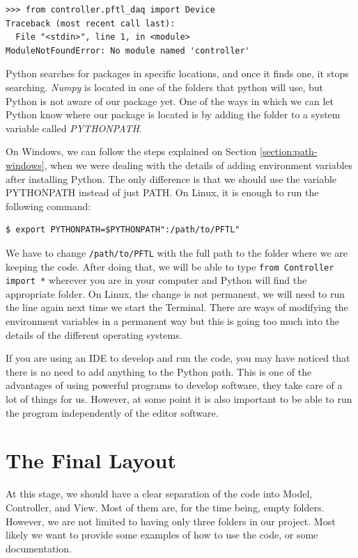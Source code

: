 \begin{verbatim}
>>> from controller.pftl_daq import Device
Traceback (most recent call last):
  File "<stdin>", line 1, in <module>
ModuleNotFoundError: No module named 'controller'
\end{verbatim}

Python searches for packages in specific locations, and once it finds one, it stops searching. \emph{Numpy} is located in one of the folders that python will use, but Python is not aware of our package yet. One of the ways in which we can let Python know where our package is located is by adding the folder to a system variable called \emph{PYTHONPATH}.

On Windows, we can follow the steps explained on Section \ref{section:path-windows}, when we were dealing with the details of adding environment variables after installing Python. The only difference is that we should use the variable PYTHONPATH instead of just PATH. On Linux, it is enough to run the following command:

\begin{verbatim}
$ export PYTHONPATH=$PYTHONPATH":/path/to/PFTL"
\end{verbatim}

We have to change \texttt{/path/to/PFTL} with the full path to the folder where we are keeping the code. After doing that, we will be able to type \texttt{from Controller import *} wherever you are in your computer and Python will find the appropriate folder. On Linux, the change is not permanent, we will need to run the line again next time we start the Terminal. There are ways of modifying the environment variables in a permanent way but this is going too much into the details of the different operating systems.

If you are using an IDE to develop and run the code, you may have noticed that there is no need to add anything to the Python path. This is one of the advantages of using powerful programs to develop software, they take care of a lot of things for us. However, at some point it is also important to be able to run the program independently of the editor software.

\section{The Final Layout}\label{section:final-layout}
At this stage, we should have a clear separation of the code into Model, Controller, and View. Most of them are, for the time being, empty folders. However, we are not limited to having only three folders in our project. Most likely we want to provide some examples of how to use the code, or some documentation.

